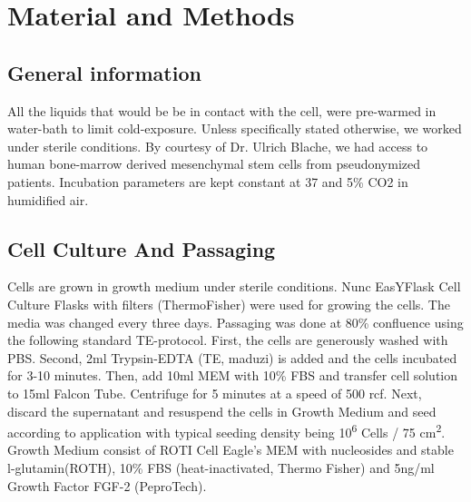 \newcommand{\product}{\textit}

\chapter{Material and Methods}

\section{General information}
All the liquids that would be be in contact with the cell, were pre-warmed in water-bath to limit cold-exposure. Unless specifically stated otherwise, we worked under sterile conditions. By courtesy of Dr. Ulrich Blache, we had access to human bone-marrow derived mesenchymal stem cells from pseudonymized patients. Incubation parameters are kept constant at 37 \degC{} and 5\% CO2 in humidified air.

\section{Cell Culture And Passaging}

Cells are grown in growth medium under sterile conditions. Nunc\texttrademark{} EasYFlask\texttrademark{} Cell Culture Flasks with filters (ThermoFisher) were used for growing the cells. The media was changed every three days. Passaging was done at 80\% confluence using the following standard TE-protocol. First, the cells are generously washed with PBS. Second, 2ml Trypsin-EDTA (TE, maduzi) is added and the cells incubated for 3-10 minutes. Then, add 10ml MEM\textalpha{} with 10\% FBS and transfer cell solution to 15ml Falcon Tube. Centrifuge for 5 minutes at a speed of 500 rcf. Next, discard the supernatant and resuspend the cells in Growth Medium and seed according to application with typical seeding density being 10\textsuperscript{6} Cells / 75 cm\textsuperscript{2}. 
Growth Medium consist of ROTI\textregistered{} Cell Eagle's MEM\textalpha{} with nucleosides and stable l-glutamin(ROTH), 10\% FBS (heat-inactivated, Thermo Fisher) and 5ng/ml Growth Factor FGF-2 (PeproTech).

